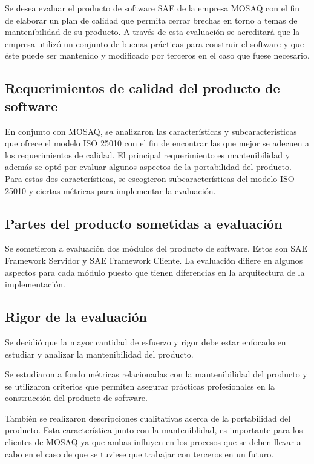 Se desea evaluar el producto de software SAE de la empresa MOSAQ con el fin de
elaborar un plan de calidad que permita cerrar brechas en torno a temas de 
mantenibilidad de su producto. A través de esta evaluación se acreditará que la 
empresa utilizó un conjunto de buenas prácticas para construir el software y que 
éste puede ser mantenido y modificado por terceros en el caso que fuese necesario.

\subsection{Requerimientos de calidad del producto de software}

En conjunto con MOSAQ, se analizaron las características y subcaracterísticas que ofrece
el modelo ISO 25010 con el fin de encontrar las que mejor se adecuen a los requerimientos
de calidad. El principal requerimiento es mantenibilidad y además se optó por evaluar
algunos aspectos de la portabilidad del producto. Para estas dos características, se
escogieron subcaracterísticas del modelo ISO 25010 y ciertas métricas para implementar
la evaluación.

\subsection{Partes del producto sometidas a evaluación}

Se sometieron a evaluación dos módulos del producto de software. Estos son SAE Framework
Servidor y SAE Framework Cliente. La evaluación difiere en algunos aspectos para cada módulo
puesto que tienen diferencias en la arquitectura de la implementación.

\subsection{Rigor de la evaluación}

Se decidió que la mayor cantidad de esfuerzo y rigor debe estar enfocado en estudiar y
analizar la mantenibilidad del producto. 

Se estudiaron a fondo métricas relacionadas con la mantenibilidad del producto y se
utilizaron criterios que permiten asegurar prácticas profesionales en la construcción
del producto de software.

También se realizaron descripciones cualitativas acerca de la portabilidad del producto.
Esta característica junto con la manteniblidad, es importante para los clientes de MOSAQ
ya que ambas influyen en los procesos que se deben llevar a cabo en el caso de que se tuviese
que trabajar con terceros en un futuro.

